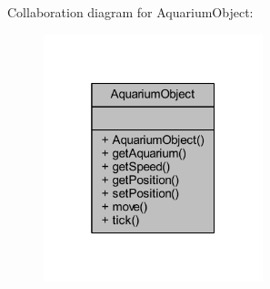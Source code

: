 Collaboration diagram for Aquarium\+Object\+:
\nopagebreak
\begin{figure}[H]
\begin{center}
\leavevmode
\includegraphics[width=181pt]{class_aquarium_object__coll__graph}
\end{center}
\end{figure}
